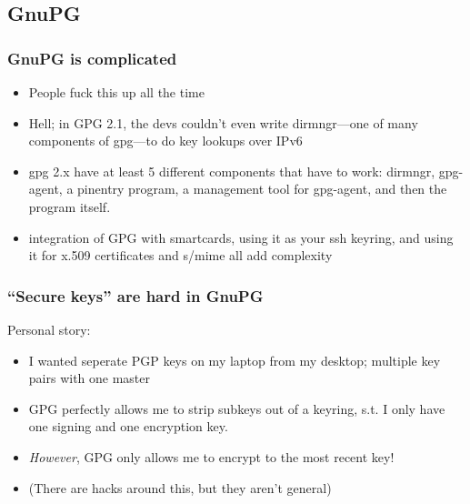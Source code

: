 \documentclass[aspectratio=1610,bigger,utf8]{beamer}
\begin{document}
\subsection{GnuPG}
\begin{frame}
	\frametitle{GnuPG is complicated}
	\begin{itemize}
		\item People fuck this up all the time
		\item Hell; in GPG 2.1, the devs couldn't even write
			dirmngr---one of many components of gpg---to do key
			lookups over IPv6
		\item gpg 2.x have at least 5 different components that have to
			work: dirmngr, gpg-agent, a pinentry program, a
			management tool for gpg-agent, and then the program
			itself.
		\item integration of GPG with smartcards, using it as your ssh
			keyring, and using it for x.509 certificates and s/mime
			all add complexity
	\end{itemize}
\end{frame}
\begin{frame}
	\frametitle{``Secure keys'' are hard in GnuPG}
	Personal story:
	\begin{itemize}
		\item I wanted seperate PGP keys on my laptop from my desktop;
			multiple key pairs with one master
		\item GPG perfectly allows me to strip subkeys out of a
			keyring, s.t. I only have one signing and one
			encryption key.
		\item \emph{However}, GPG only allows me to encrypt to the
			\alert{most recent} key!
		\item (There are hacks around this, but they aren't general)
	\end{itemize}
\end{frame}
\end{document}
